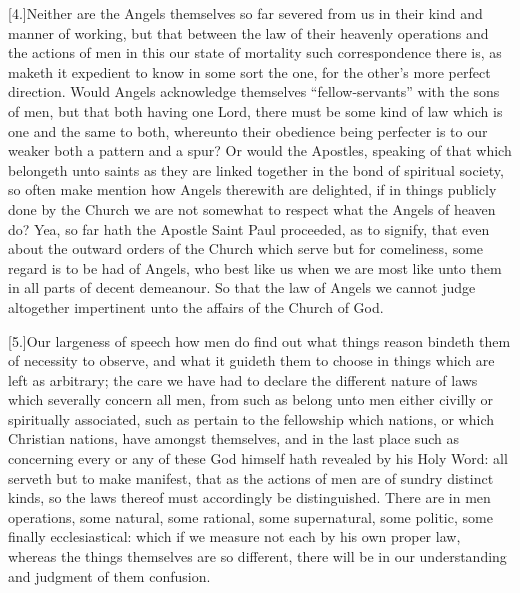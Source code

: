 [4.]Neither are the Angels themselves so far severed from us in their kind and manner of working, but that between the law of their heavenly operations and the actions of men in this our state of mortality such correspondence there is, as maketh it expedient to know in some sort the one, for the other’s more perfect direction. Would Angels acknowledge  themselves “fellow-servants” with the sons of men, but that both having one Lord, there must be some kind of law which is one and the same to both, whereunto their obedience being perfecter is to our weaker both a pattern and a spur? Or would the Apostles, speaking of that which belongeth unto saints as they are linked together in the bond of spiritual society, so often make mention how Angels therewith are delighted, if in things publicly done by the Church we are not somewhat to respect what the Angels of heaven do? Yea, so far hath the Apostle Saint Paul proceeded, as to signify, that even about the outward orders of the Church which serve but for comeliness, some regard is to be had of Angels, who best like us when we are most like unto them in all parts of decent demeanour. So that the law of Angels we cannot judge altogether impertinent unto the affairs of the Church of God.

[5.]Our largeness of speech how men do find out what things reason bindeth them of necessity to observe, and what it guideth them to choose in things which are left as arbitrary; the care we have had to declare the different nature of laws which severally concern all men, from such as belong unto men either civilly or spiritually associated, such as pertain to the fellowship which nations, or which Christian nations, have amongst themselves, and in the last place such as concerning every or any of these God himself hath revealed by his Holy Word: all serveth but to make manifest, that as the actions of men are of sundry distinct kinds, so the laws thereof must accordingly be distinguished. There are in men operations, some natural, some rational, some supernatural, some politic, some finally ecclesiastical: which if we measure not each by his own proper law, whereas the things themselves are so different, there will be in our understanding and judgment of them confusion.


